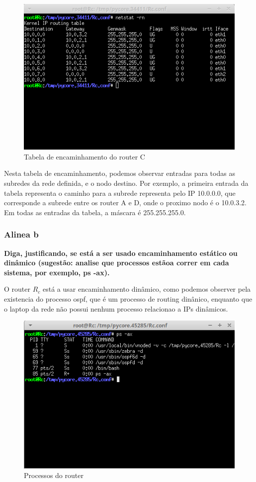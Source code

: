 \documentclass{article}
\begin{document}
\begin{figure}[h]
	\centering
	\includegraphics[scale = 0.6]{tabela-enderecamento-Rc.png}
	\caption{Tabela de encaminhamento do router C}
\end{figure}

Nesta tabela de encaminhamento, podemos observar entradas para todas as subredes da rede definida, e o nodo destino. Por exemplo, a primeira entrada da tabela representa o caminho para a subrede representa pelo IP 10.0.0.0, que corresponde a subrede entre os router A e D, onde o proximo nodo é o 10.0.3.2. Em todas as entradas da tabela, a máscara é 255.255.255.0. 

\subsubsection{Alinea b}
\textbf{Diga, justificando, se está a ser usado encaminhamento estático ou dinâmico (sugestão: analise que processos estãoa correr em cada sistema, por exemplo, ps -ax).}\\\par
O router $R_c$ está a usar encaminhamento dinâmico, como podemos observer pela existencia do processo ospf, que é um processo de routing dinânico, enquanto que o laptop da rede não possui nenhum processo relacionao a IPs dinâmicos.\\

\begin{figure}[h]
	\centering
	\includegraphics[scale = 0.6]{processos-routerc-ex2b.png}
	\caption{Processos do router}
\end{figure}
\end{document}
